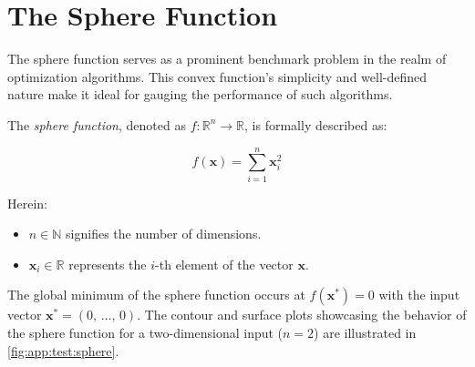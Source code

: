 \section{The Sphere Function}
\label{sec:app:test:sphere}
  The sphere function serves as a prominent benchmark problem in the realm of 
  optimization algorithms.
  This convex function's simplicity and well-defined nature make it ideal for
  gauging the performance of such algorithms.
  
  \begin{definition}
    \label{def:app:test:sphere}
    The \emph{sphere function}, denoted as \(f: \mathbb{R}^n \rightarrow 
    \mathbb{R}\), is formally described as:
  
    \begin{equation}
      \label{eq:app:test:sphere}
      f(\mathbf{x}) = \sum_{i=1}^{n} \mathbf{x}_i^2
    \end{equation}
      
    Herein:
  
    \begin{itemize}
      \item \(n \in \mathbb{N}\) signifies the number of dimensions.
      \item \(\mathbf{x}_i \in \mathbb{R}\) represents the \(i\)-th element of 
        the vector \(\mathbf{x}\).
    \end{itemize}
  \end{definition}

  The global minimum of the sphere function occurs at \(f(\mathbf{x}^*) = 0\) 
  with the input vector \(\mathbf{x}^* = (0,\, \ldots,\, 0)\).
  The contour and surface plots showcasing the behavior of the sphere function
  for a two-dimensional input (\(n = 2\)) are illustrated in 
  \vref{fig:app:test:sphere}.


